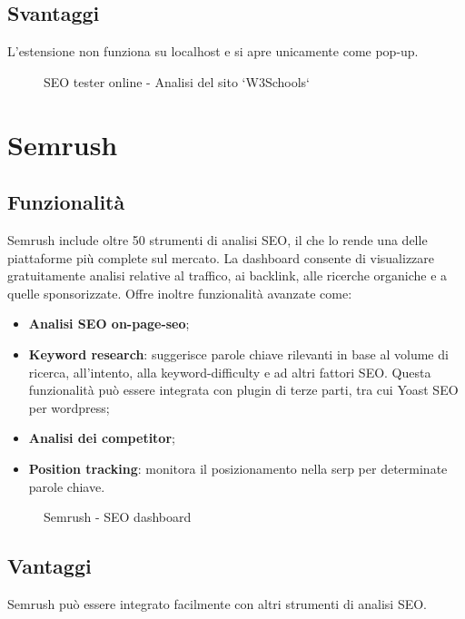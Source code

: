 \subsection{Svantaggi}
\par L'estensione non funziona su \gls{localhost} e si apre unicamente come pop-up.

\begin{figure}[H]
    \centering 
    \caption{SEO tester online - Analisi del sito `W3Schools`}
\end{figure}

\section{Semrush}

\subsection{Funzionalità}
\par Semrush include oltre 50 strumenti di analisi SEO, il che lo rende una delle piattaforme più complete sul mercato. La dashboard consente di visualizzare gratuitamente analisi relative al traffico, ai \gls{backlink}, alle ricerche \gls{organiche} e a quelle \gls{sponsorizzate}. Offre inoltre funzionalità avanzate come:
\begin{itemize}
    \item \textbf{Analisi SEO \gls{on-page-seo}};
    \item \textbf{Keyword research}: suggerisce parole chiave rilevanti in base al volume di ricerca, all'intento, alla \gls{keyword-difficulty} e ad altri fattori SEO. Questa funzionalità può essere integrata con plugin di terze parti, tra cui Yoast SEO per \gls{wordpress};
    \item \textbf{Analisi dei competitor};
    \item \textbf{Position tracking}: monitora il posizionamento nella \gls{serp} per determinate parole chiave.
\end{itemize}

\begin{figure}[H] 
    \centering 
    \caption{Semrush - SEO dashboard}
\end{figure}

\subsection{Vantaggi}
\par Semrush può essere integrato facilmente con altri strumenti di analisi SEO.

